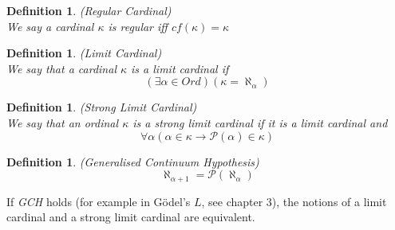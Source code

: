 \documentclass[12pt,a4paper]{article}
\newtheorem{definition}[theorem]{Definition}
\newcommand{\power}[1]{\ensuremath{\mathscr{P}} (#1)}
\newcommand{\then}{\rightarrow}
\begin{document}
\begin{definition}{(Regular Cardinal)}\label{def:regular_cardinal}\\
We say a cardinal $\kappa$ is regular iff $cf(\kappa) = \kappa$
\end{definition}

\begin{definition}{(Limit Cardinal)}\label{def:limit_cardinal}\\
We say that a cardinal $\kappa$ is a \emph{limit cardinal} if
\begin{equation}
(\exists \alpha \in Ord)(\kappa = \aleph_\alpha)
\end{equation}
\end{definition}

\begin{definition}{(Strong Limit Cardinal)}\label{def:strong_limit_cardinal}\\
We say that an ordinal $\kappa$ is a \emph{strong limit cardinal} if it is a \emph{limit cardinal} and 
\begin{equation}
\forall \alpha (\alpha \in \kappa \then \power{\alpha} \in \kappa)
\end{equation}
\end{definition}

\begin{definition}{(Generalised Continuum Hypothesis)}\label{def:gch}\\
\begin{equation}
\aleph_{\alpha+1}=\power{\aleph_\alpha}
\end{equation}
\end{definition}
If \emph{GCH} holds (for example in Gödel's $L$, see chapter 3), the notions of a limit cardinal and a strong limit cardinal are equivalent.

\
\end{document}
